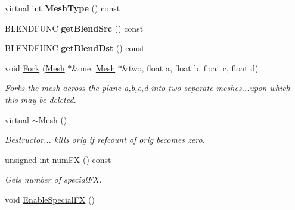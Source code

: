 \begin{DoxyCompactItemize}
\item 
virtual int {\bfseries Mesh\+Type} () const \hypertarget{classMesh_aae6c0ebcb7f3ab28331006865c17e67a}{}\label{classMesh_aae6c0ebcb7f3ab28331006865c17e67a}

\item 
B\+L\+E\+N\+D\+F\+U\+NC {\bfseries get\+Blend\+Src} () const \hypertarget{classMesh_a0a34a217fc1497b60d0a121b25dde93c}{}\label{classMesh_a0a34a217fc1497b60d0a121b25dde93c}

\item 
B\+L\+E\+N\+D\+F\+U\+NC {\bfseries get\+Blend\+Dst} () const \hypertarget{classMesh_a239cf5e6d5253393fce20fb02dfd4844}{}\label{classMesh_a239cf5e6d5253393fce20fb02dfd4844}

\item 
void \hyperlink{classMesh_ad4af646ca1aee477e5559e3d11a01a55}{Fork} (\hyperlink{classMesh}{Mesh} $\ast$\&one, \hyperlink{classMesh}{Mesh} $\ast$\&two, float a, float b, float c, float d)\hypertarget{classMesh_ad4af646ca1aee477e5559e3d11a01a55}{}\label{classMesh_ad4af646ca1aee477e5559e3d11a01a55}

\begin{DoxyCompactList}\small\item\em Forks the mesh across the plane a,b,c,d into two separate meshes...upon which this may be deleted. \end{DoxyCompactList}\item 
virtual \hyperlink{classMesh_a5efe4da1a4c0971cfb037bd70304c303}{$\sim$\+Mesh} ()\hypertarget{classMesh_a5efe4da1a4c0971cfb037bd70304c303}{}\label{classMesh_a5efe4da1a4c0971cfb037bd70304c303}

\begin{DoxyCompactList}\small\item\em Destructor... kills orig if refcount of orig becomes zero. \end{DoxyCompactList}\item 
unsigned int \hyperlink{classMesh_a432a7a3c98b056d6bee7a968f136adcb}{num\+FX} () const \hypertarget{classMesh_a432a7a3c98b056d6bee7a968f136adcb}{}\label{classMesh_a432a7a3c98b056d6bee7a968f136adcb}

\begin{DoxyCompactList}\small\item\em Gets number of special\+FX. \end{DoxyCompactList}\item 
void \hyperlink{classMesh_a9cd57eaeeed589dd076070e2e6c3c7bc}{Enable\+Special\+FX} ()\hypertarget{classMesh_a9cd57eaeeed589dd076070e2e6c3c7bc}{}\label{classMesh_a9cd57eaeeed589dd076070e2e6c3c7bc}


\end{DoxyCompactItemize}

